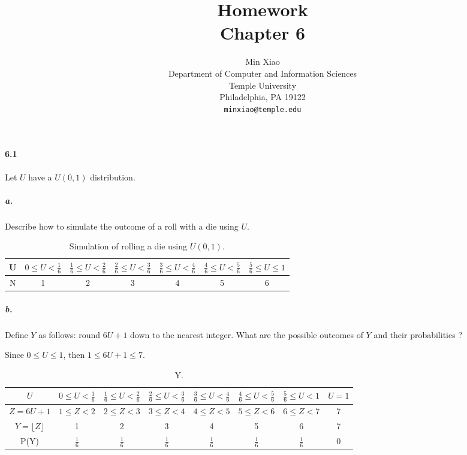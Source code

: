 \documentclass{article} %
\title{Homework \\
Chapter 6}
\author{
Min Xiao\\
Department of Computer and Information Sciences\\
Temple University\\
Philadelphia, PA 19122 \\
\texttt{minxiao@temple.edu} \\
}
\begin{document}
\maketitle

\paragraph*{6.1} Let $U$ have a $U(0, 1)$ distribution. 

\subparagraph*{a.} Describe how to simulate the outcome of a roll with a die using $U$. 

\begin{table}[h!]
\renewcommand{\arraystretch}{1.5}
\centering
\caption{Simulation of rolling a die using $U(0, 1)$.}
\label{Ta:6.1a}
\begin{tabular}{|c|c|c|c|c|c|c|} \hline
U & $0\leq U < \frac{1}{6}$ & $\frac{1}{6} \leq U < \frac{2}{6}$ & 
$\frac{2}{6} \leq U < \frac{3}{6}$ & $\frac{3}{6} \leq U < \frac{4}{6}$ & 
$\frac{4}{6} \leq U < \frac{5}{6}$ & $\frac{5}{6} \leq U \leq 1$ \\ \hline 
N & 1 & 2 & 3 & 4 & 5 & 6 \\ \hline 
\end{tabular}
\end{table}

\subparagraph*{b.} Define $Y$ as follows: round $6U+1$ down to the nearest integer. What are the possible outcomes of $Y$ and their probabilities ? 

Since $0 \leq U \leq 1$, then $1 \leq 6U + 1 \leq 7$. 
\begin{table}[h!]
\renewcommand{\arraystretch}{1.5}
\centering
\caption{Y.}
\label{Ta:6.1b}
\begin{tabular}{|c|c|c|c|c|c|c|c|} \hline
$U$ & $0\leq U < \frac{1}{6}$ & $\frac{1}{6} \leq U < \frac{2}{6}$ & 
$\frac{2}{6} \leq U < \frac{3}{6}$ & $\frac{3}{6} \leq U < \frac{4}{6}$ & 
$\frac{4}{6} \leq U < \frac{5}{6}$ & $\frac{5}{6} \leq U < 1$ & $U=1$\\ \hline 
$Z=6U + 1$ & $1\leq Z < 2$ & $2 \leq Z <3$ & 
$3 \leq Z < 4$ & $4 \leq Z < 5$ & 
$5 \leq Z < 6$ & $6 \leq Z < 7$ & 7\\ \hline 
$Y=\lfloor Z \rfloor$ & 1 & 2 & 3 & 4 & 5 & 6 & 7 \\ \hline
P(Y) & $\frac{1}{6}$ & $\frac{1}{6}$ & $\frac{1}{6}$ & $\frac{1}{6}$ & $\frac{1}{6}$ & $\frac{1}{6}$ & 0 
\\ \hline 
\end{tabular}
\end{table}
\end{document}
